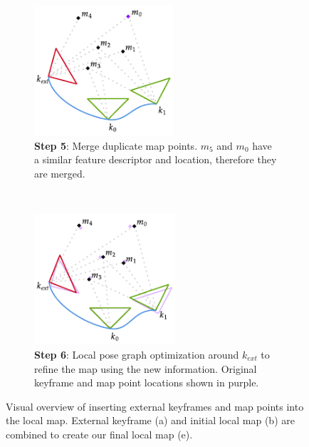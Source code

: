\begin{figure}[h]
\begin{subfigure}[t]{0.333\textwidth}
    \end{subfigure}%
    ~
    \begin{subfigure}[t]{0.333\textwidth}
        \centering
        \includegraphics[height=1.9in]{figures/external_key_frame_insertion_4.pdf}
        \caption{\textbf{Step 5}: Merge duplicate map points. $m_5$ and $m_0$ have a similar feature descriptor and location, therefore they are merged.}
    \end{subfigure}%
    ~
    \begin{subfigure}[t]{0.333\textwidth}
        \centering
        \includegraphics[height=1.9in]{figures/external_key_frame_insertion_5.pdf}
        \caption{\textbf{Step 6}: Local pose graph optimization around $k_{ext}$ to refine the map using the new information. Original keyframe and map point locations shown in purple.}
    \end{subfigure}%

    \caption{Visual overview of inserting external keyframes and map points into the local map. External keyframe (a) and initial local map (b) are combined to create our final local map (e).}

\end{figure}


